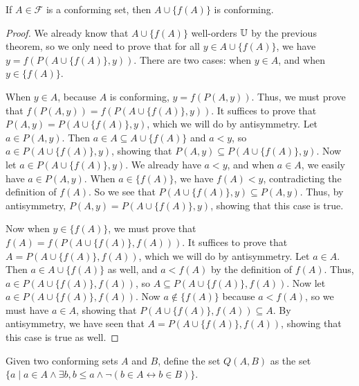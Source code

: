 \documentclass[../../math.tex]{subfiles}
\begin{document}
\begin{lemma} \label{conforming_add_conforming}
    If $A \in \mathcal F$ is a conforming set, then $A \cup \{f(A)\}$ is
    conforming.
\end{lemma}
\begin{proof}
    We already know that $A \cup \{f(A)\}$ well-orders $\mathbb{U}$ by the previous
    theorem, so we only need to prove that for all $y \in A \cup \{f(A)\}$, we
    have $y = f(P(A \cup \{f(A)\}, y))$.  There are two cases: when $y
    \in A$, and when $y \in \{f(A)\}$.

    When $y \in A$, because $A$ is conforming, $y = f(P(A, y))$.  Thus, we must
    prove that $f(P(A, y)) = f(P(A \cup \{f(A)\}, y))$.  It suffices to prove
    that $P(A, y) = P(A \cup \{f(A)\}, y)$, which we will do by antisymmetry.
    Let $a \in P(A, y)$.  Then $a \in A \subseteq A \cup \{f(A)\}$ and $a < y$,
    so $a \in P(A \cup \{f(A)\}, y)$, showing that $P(A, y) \subseteq P(A \cup
    \{f(A)\}, y)$.  Now let $a \in P(A \cup \{f(A)\}, y)$.  We already have $a <
    y$, and when $a \in A$, we easily have $a \in P(A, y)$.
    When $a \in \{f(A)\}$, we have $f(A) < y$, contradicting the definition of
    $f(A)$.  So we see that $P(A \cup \{f(A)\}, y) \subseteq P(A, y)$.  Thus, by
    antisymmetry, $P(A, y) = P(A \cup \{f(A)\}, y)$, showing that this case is
    true.

    Now when $y \in \{f(A)\}$, we must prove that $f(A) = f(P(A \cup \{f(A)\},
    f(A)))$.  It suffices to prove that $A = P(A \cup \{f(A)\}, f(A))$, which we
    will do by antisymmetry.  Let $a \in A$.  Then $a \in A \cup \{f(A)\}$ as
    well, and $a < f(A)$ by the definition of $f(A)$.  Thus, $a \in P(A \cup
    \{f(A)\}, f(A))$, so $A \subseteq P(A \cup \{f(A)\}, f(A))$.  Now let $a \in
    P(A \cup \{f(A)\}, f(A))$.  Now $a \notin \{f(A)\}$ because $a < f(A)$, so
    we must have $a \in A$, showing that $P(A \cup \{f(A)\}, f(A)) \subseteq A$.
    By antisymmetry, we have seen that $A = P(A \cup \{f(A)\}, f(A))$, showing
    that this case is true as well.
\end{proof}

\begin{definition}
    Given two conforming sets $A$ and $B$, define the set $Q(A, B)$ as the set
    $\{a \mid a \in A \wedge \exists b, b \leq a \wedge \neg(b \in A
    \leftrightarrow b \in B)\}$.
\end{definition}
\end{document}

